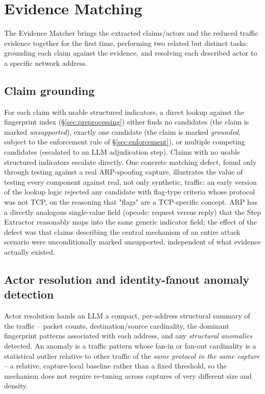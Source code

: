 \documentclass[sigconf,nonacm]{acmart}
\begin{document}
\section{Evidence Matching}
\label{sec:evidence-matching}

The Evidence Matcher brings the extracted claims/actors and the reduced
traffic evidence together for the first time, performing two related but
distinct tasks: grounding each claim against the evidence, and resolving each
described actor to a specific network address.

\subsection{Claim grounding}

For each claim with usable structured indicators, a direct lookup against the
fingerprint index (\S\ref{sec:preprocessing}) either finds no candidates (the
claim is marked \emph{unsupported}), exactly one candidate (the claim is
marked \emph{grounded}, subject to the enforcement rule of
\S\ref{sec:enforcement}), or multiple competing candidates (escalated to an
LLM adjudication step). Claims with no usable structured indicators escalate
directly. One concrete matching defect, found only through testing against a
real ARP-spoofing capture, illustrates the value of testing every component
against real, not only synthetic, traffic: an early version of the lookup
logic rejected any candidate with flag-type criteria whose protocol was not
TCP, on the reasoning that "flags" are a TCP-specific concept. ARP has a
directly analogous single-value field (opcode: request versus reply) that the
Step Extractor reasonably maps into the same generic indicator field; the
effect of the defect was that claims describing the central mechanism of an
entire attack scenario were unconditionally marked unsupported, independent of
what evidence actually existed.

\subsection{Actor resolution and identity-fanout anomaly detection}
\label{sec:anomaly-detection}

Actor resolution hands an LLM a compact, per-address structural summary of the
traffic -- packet counts, destination/source cardinality, the dominant
fingerprint patterns associated with each address, and any \emph{structural
anomalies} detected. An anomaly is a traffic pattern whose fan-in or fan-out
cardinality is a statistical outlier relative to other traffic of the
\emph{same protocol in the same capture} -- a relative, capture-local baseline
rather than a fixed threshold, so the mechanism does not require re-tuning
across captures of very different size and density.
\end{document}
